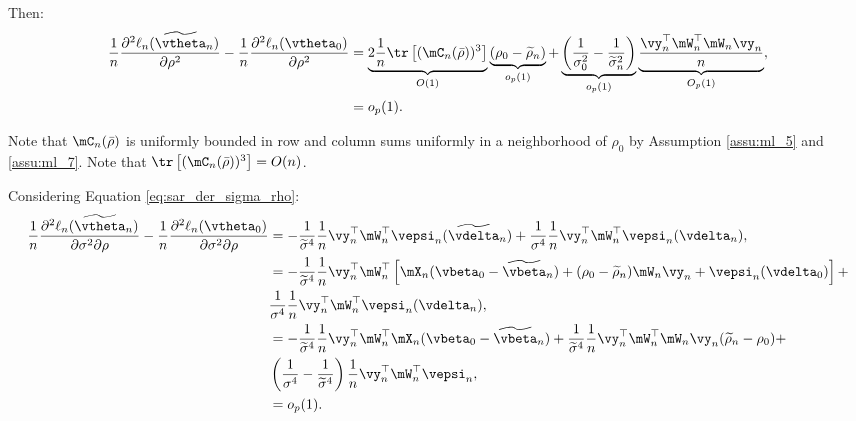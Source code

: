 \documentclass[english,12pt]{book}\usepackage[]{graphicx}\usepackage[]{xcolor}
\begin{document}
\begin{subappendices}
\begin{enumerate}
Then:
\begin{equation*}
    \begin{aligned}
    \frac{1}{n}\frac{\partial^2 \ell_n(\widetilde{\vtheta}_n)}{\partial \rho^2} - \frac{1}{n}\frac{\partial^2 \ell_n(\vtheta_0)}{\partial\rho^2} & = \underbrace{2\frac{1}{n}\tr\left[(\mC_n(\bar{\rho}))^3\right]}_{O(1)} \underbrace{(\rho_0 - \widetilde{\rho}_n)}_{o_p(1)} + \underbrace{\left(\frac{1}{\sigma^2_0} - \frac{1}{\widetilde{\sigma}^2_n}\right)}_{o_p(1)}\underbrace{\frac{\vy_n^{\top}\mW^{\top}_n\mW_n\vy_n}{n}}_{O_p(1)}, \\
    & = o_p(1).
    \end{aligned}
\end{equation*}
   
   Note that $\mC_n(\bar{\rho})$ is uniformly bounded in row and column sums uniformly in a neighborhood of $\rho_0$ by  Assumption \ref{assu:ml_5} and \ref{assu:ml_7}. Note that $\tr\left[(\mC_n(\bar{\rho}))^3\right] = O(n)$.
   
  Considering Equation \eqref{eq:sar_der_sigma_rho}:
    \begin{equation*}
    \begin{aligned}
    \frac{1}{n}\frac{\partial^2 \ell_n(\widetilde{\vtheta}_n)}{\partial \sigma^2 \partial \rho} - \frac{1}{n}\frac{\partial^2 \ell_n(\vtheta_0)}{\partial \sigma^2 \partial \rho}& = -\frac{1}{\widetilde{\sigma}^4}\frac{1}{n}\vy_n^\top\mW_n^\top\vepsi_n(\widetilde{\vdelta}_n) + \frac{1}{\sigma^4}\frac{1}{n}\vy_n^\top\mW_n^\top\vepsi_n(\vdelta_n),\\
    & = -\frac{1}{\widetilde{\sigma}^4}\frac{1}{n}\vy_n^\top\mW_n^\top\left[\mX_n(\vbeta_0 - \widetilde{\vbeta}_n) + (\rho_0 - \widetilde{\rho}_n)\mW_n\vy_n + \vepsi_n(\vdelta_0)\right] + \\
    &  \frac{1}{\sigma^4}\frac{1}{n}\vy_n^\top\mW_n^\top\vepsi_n(\vdelta_n), \\
    &= -\frac{1}{\widetilde{\sigma}^4}\frac{1}{n}\vy_n^\top\mW_n^\top\mX_n(\vbeta_0 - \widetilde{\vbeta}_n)  + \frac{1}{\widetilde{\sigma}^4}\frac{1}{n}\vy_n^\top\mW_n^\top\mW_n\vy_n(\widetilde{\rho}_n-\rho_0) + \\
    & \left(\frac{1}{\sigma^4}-\frac{1}{\widetilde{\sigma}^4}\right)\frac{1}{n}\vy_n^\top\mW_n^\top\vepsi_{n}, \\
    & = o_p(1).
    \end{aligned}
   \end{equation*}
   

\end{enumerate}
\end{subappendices}
\end{document}
